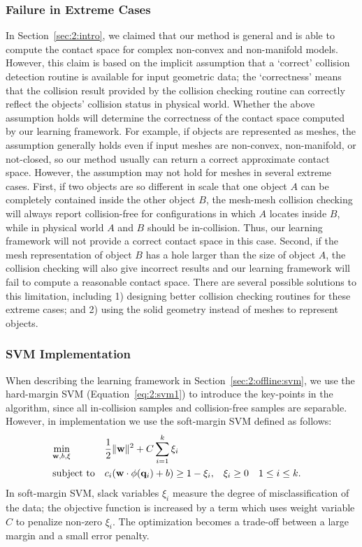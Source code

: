 \subsubsection{Failure in Extreme Cases}
In Section~\ref{sec:2:intro}, we claimed that our method is general and is able to compute the contact space for complex non-convex and non-manifold models. However, this claim is based on the implicit assumption that a `correct' collision detection routine is available for input geometric data; the `correctness' means that the collision result provided by the collision checking routine can correctly reflect the objects' collision status in physical world. Whether the above assumption holds will determine the correctness of the contact space computed by our learning framework. For example, if objects are represented as meshes, the assumption generally holds even if input meshes are non-convex, non-manifold, or not-closed, so our method usually can return a correct approximate contact space. However, the assumption may not hold for meshes in several extreme cases. First, if two objects are so different in scale that one object $A$ can be completely contained inside the other object $B$, the mesh-mesh collision checking will always report collision-free for configurations in which $A$ locates inside $B$, while in physical world $A$ and $B$ should be in-collision. Thus, our learning framework will not provide a correct contact space in this case. Second, if the mesh representation of object $B$ has a hole larger than the size of object $A$, the collision checking will also give incorrect results and our learning framework will fail to compute a reasonable contact space. There are several possible solutions to this limitation, including 1) designing better collision checking routines for these extreme cases; and 2) using the solid geometry instead of meshes to represent objects.

\subsubsection{SVM Implementation}
When describing the learning framework in Section~\ref{sec:2:offline:svm}, we use the hard-margin SVM (Equation~\ref{eq:2:svm1}) to introduce the key-points in the algorithm, since all in-collision samples and collision-free samples are separable. However, in implementation we use the soft-margin SVM defined as follows:
\begin{align}
\label{eq:2:svmsoft}
& \underset{\mathbf w, b, \xi}{\text{min}} & & \frac{1}{2}\|\mathbf w\|^2 + C \sum_{i=1}^k \xi_i & &  \\
& \text{subject to} & & c_i (\mathbf w \cdot \phi(\mathbf q_i) + b)
\geq 1 - \xi_i, & & \xi_i \geq 0 & & 1 \leq i \leq k. \notag
\end{align}
In soft-margin SVM, slack variables $\xi_i$ measure the degree of misclassification of the data; the objective function is increased by a term which uses weight variable $C$ to penalize non-zero $\xi_i$. The optimization becomes a trade-off between a large margin and a small error penalty. 

